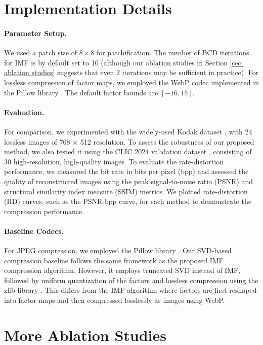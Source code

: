 \section{Implementation Details} \label{sec: implementation details}

\paragraph{Parameter Setup.} We used a patch size of $8 \times 8$ for patchification. The number of BCD iterations for IMF is by default set to 10 (although our ablation studies in Section \ref{sec: ablation studies} suggests that even 2 iterations may be sufficient in practice). For lossless compression of factor maps, we employed the WebP codec implemented in the Pillow library \cite{clark2015pillow}. The default factor bounds are $[-16, 15]$.

\paragraph{Evaluation.} For comparison, we experimented with the widely-used Kodak dataset \cite{kodak1993}, with 24 lossless images of 768 × 512 resolution. To assess the robustness of our proposed method, we also tested it using the CLIC 2024 validation dataset \cite{clic2024}, consisting of 30 high-resolution, high-quality images. To evaluate the rate-distortion performance, we measured the bit rate in bits per pixel (bpp) and assessed the quality of reconstructed images using the peak signal-to-noise ratio (PSNR) and structural similarity index measure (SSIM) metrics. We plotted rate-distortion (RD) curves, such as the PSNR-bpp curve, for each method to demonstrate the compression performance.

\paragraph{Baseline Codecs.} For JPEG compression, we employed the Pillow library \cite{clark2015pillow}. Our SVD-based compression baseline follows the same framework as the proposed IMF compression algorithm. However, it employs truncated SVD instead of IMF, followed by uniform quantization of the factors and lossless compression using the zlib library \cite{deutsch1996zlib}. This differs from the IMF algorithm where factors are first reshaped into factor maps and then compressed losslessly as images using WebP.

\section{More Ablation Studies}

